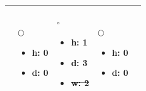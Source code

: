 \begin{table}[h]
\begin{tabular}{|p{3cm}|p{3cm}|p{3cm}|p{3cm}|p{3cm}|}
& 

 $ \bigcirc $
\begin{itemize} 
    \vspace*{-1\baselineskip} 
    \item h: 0
    \item d: 0
\end{itemize} 


& 

 $ \square $
\begin{itemize} 
    \vspace*{-1\baselineskip} 
    \item h: 1
    \item d: 3
    \item  \sout{w: 2}
\end{itemize} 


& 

 $ \bigcirc $
\begin{itemize} 
    \vspace*{-1\baselineskip} 
    \item h: 0
    \item d: 0
\end{itemize} 

\\ \hline



\end{tabular}
\end{table}






